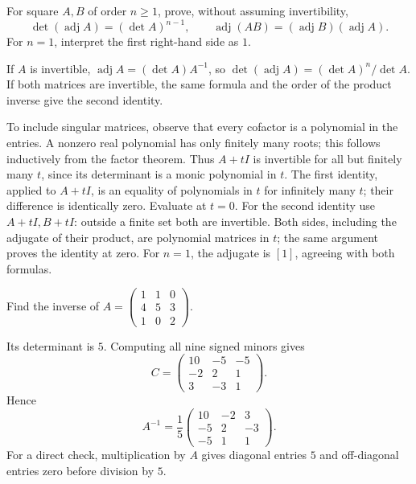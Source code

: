 \begin{problem}\label{ex:07:adjugate}
For square \(A,B\) of order \(n\geqslant1\), prove, without assuming
invertibility,
\[
 \det(\operatorname{adj}A)=(\det A)^{n-1},\qquad
 \operatorname{adj}(AB)=(\operatorname{adj}B)(\operatorname{adj}A).
\]
For \(n=1\), interpret the first right-hand side as \(1\).
\end{problem}
\begin{solution}
If \(A\) is invertible, \(\operatorname{adj}A=(\det A)A^{-1}\), so
\(\det(\operatorname{adj}A)=(\det A)^n/\det A\).
If both matrices are invertible, the same formula and the order of the
product inverse give the second identity.

To include singular matrices, observe that every cofactor is a polynomial
in the entries. A nonzero real polynomial has only finitely many roots;
this follows inductively from the factor theorem. Thus \(A+tI\) is
invertible for all but finitely many \(t\), since its determinant is a
monic polynomial in \(t\). The first identity, applied to \(A+tI\),
is an equality of polynomials in \(t\) for infinitely many \(t\);
their difference is identically zero. Evaluate at \(t=0\).
For the second identity use \(A+tI,B+tI\): outside a finite set both
are invertible. Both sides, including the adjugate of their product,
are polynomial matrices in \(t\); the same argument proves the identity
at zero. For \(n=1\), the adjugate is \([1]\), agreeing with both formulas.
\end{solution}

\begin{problem}\label{ex:07:inverse}
Find the inverse of \(A=\begin{pmatrix}1&1&0\\4&5&3\\1&0&2\end{pmatrix}\).
\end{problem}
\begin{solution}
Its determinant is \(5\). Computing all nine signed minors gives
\[
 C=\begin{pmatrix}10&-5&-5\\-2&2&1\\3&-3&1\end{pmatrix}.
\]
Hence
\[
 A^{-1}=\frac15\begin{pmatrix}10&-2&3\\-5&2&-3\\-5&1&1\end{pmatrix}.
\]
For a direct check, multiplication by \(A\) gives diagonal entries \(5\)
and off-diagonal entries zero before division by \(5\).
\end{solution}

